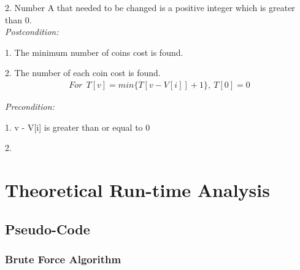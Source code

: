 \documentclass[11pt]{scrreprt}
\begin{document}
2. Number A that needed to be changed is a positive integer which is greater than 0.\\

\emph{Postcondition:}

1. The minimum number of coins cost is found.

2. The number of each coin cost is found.\\

\begin{eqnarray*}
For\ \  T[v] = min\{T[v-V[i]] + 1\},\ T[0] = 0
\end{eqnarray*}

\emph{Precondition:}

1. v - V[i] is greater than or equal to 0

2. 




\chapter{Theoretical Run-time Analysis}

\section{Pseudo-Code}
\subsection {Brute Force Algorithm}
\end{document}
